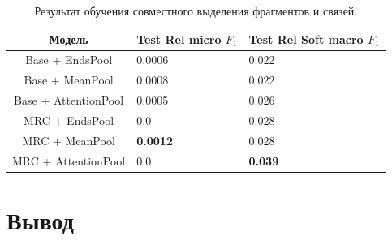 \documentclass[12pt]{article}
\begin{document}
\begin{table}[h!]
\centering
\begin{tabular}{| c || p{2cm} | p{2cm} |} 
 \hline
 Модель & Test Rel micro $F_1$ & Test Rel Soft macro $F_1$  \\ [0.5ex] 
 \hline\hline
 Base + EndsPool & 0.0006 & 0.022 \\ 
 \hline
 Base + MeanPool & 0.0008 & 0.022 \\
  \hline
 Base + AttentionPool &  0.0005 & 0.026\\ 
 \hline
 MRC + EndsPool & 0.0 & 0.028\\ 
 \hline
 MRC + MeanPool & \textbf{0.0012} & 0.028\\ 
 \hline
 MRC + AttentionPool & 0.0 & \textbf{0.039}\\[1ex] 
 \hline
\end{tabular}
\vspace{1ex}
\caption{Результат обучения совместного выделения фрагментов и связей.}
\label{table:res_joint}
\end{table}

\clearpage
\section{Вывод}
\end{document}

